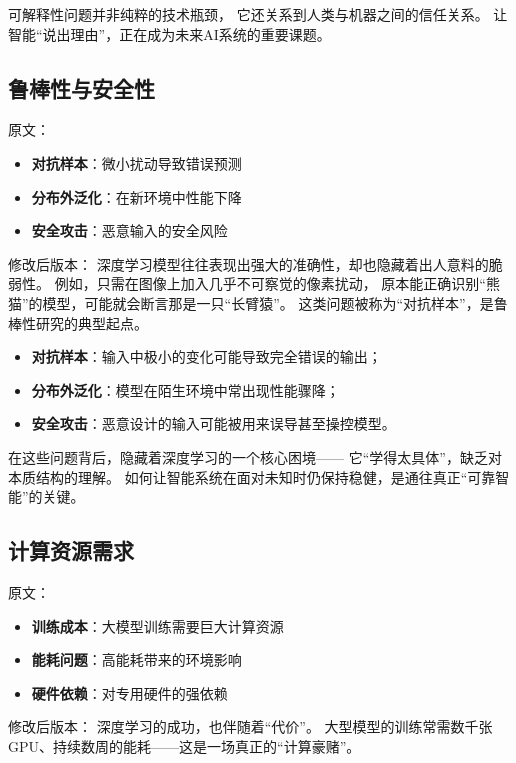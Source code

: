 可解释性问题并非纯粹的技术瓶颈，  
它还关系到人类与机器之间的信任关系。  
让智能“说出理由”，正在成为未来AI系统的重要课题。



\subsection{鲁棒性与安全性}

原文：
\begin{itemize}
\item \textbf{对抗样本}：微小扰动导致错误预测
\item \textbf{分布外泛化}：在新环境中性能下降
\item \textbf{安全攻击}：恶意输入的安全风险
\end{itemize}
修改后版本：
深度学习模型往往表现出强大的准确性，却也隐藏着出人意料的脆弱性。  
例如，只需在图像上加入几乎不可察觉的像素扰动，  
原本能正确识别“熊猫”的模型，可能就会断言那是一只“长臂猿”。  
这类问题被称为“对抗样本”，是鲁棒性研究的典型起点。

\begin{itemize}
\item \textbf{对抗样本}：输入中极小的变化可能导致完全错误的输出；
\item \textbf{分布外泛化}：模型在陌生环境中常出现性能骤降；
\item \textbf{安全攻击}：恶意设计的输入可能被用来误导甚至操控模型。
\end{itemize}

在这些问题背后，隐藏着深度学习的一个核心困境——  
它“学得太具体”，缺乏对本质结构的理解。  
如何让智能系统在面对未知时仍保持稳健，是通往真正“可靠智能”的关键。



\subsection{计算资源需求}

原文：
\begin{itemize}
\item \textbf{训练成本}：大模型训练需要巨大计算资源
\item \textbf{能耗问题}：高能耗带来的环境影响
\item \textbf{硬件依赖}：对专用硬件的强依赖
\end{itemize}
修改后版本：
深度学习的成功，也伴随着“代价”。  
大型模型的训练常需数千张 GPU、持续数周的能耗——这是一场真正的“计算豪赌”。  

